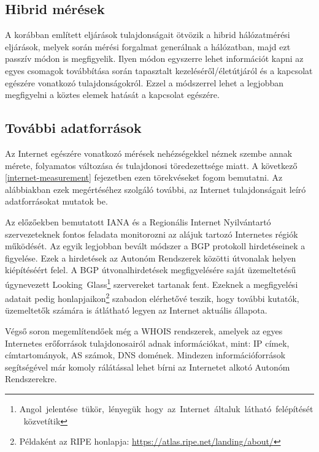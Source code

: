 \subsection{Hibrid mérések}

A korábban említett eljárások tulajdonságait ötvözik a hibrid hálózatmérési eljárások, melyek során mérési forgalmat generálnak a hálózatban, majd ezt passzív módon is megfigyelik. Ilyen módon egyszerre lehet információt kapni az egyes csomagok továbbítása során tapasztalt kezeléséről/életútjáról és a kapcsolat egészére vonatkozó tulajdonságokról. Ezzel a módszerrel lehet a legjobban megfigyelni a köztes elemek hatását a kapcsolat egészére.


\pagebreak

\subsection{További adatforrások}

Az Internet egészére vonatkozó mérések nehézségekkel néznek szembe annak mérete, folyamatos változása és tulajdonosi töredezettsége miatt. A következő \ref{internet-measurement} fejezetben ezen törekvéseket fogom bemutatni. Az alábbiakban ezek megértéséhez szolgáló további, az Internet tulajdonságait leíró adatforrásokat mutatok be.

Az előzőekben bemutatott IANA és a Regionális Internet Nyilvántartó szervezeteknek fontos feladata monitorozni az alájuk tartozó Internetes régiók működését. Az egyik legjobban bevált módszer a BGP protokoll hirdetéseinek a figyelése. Ezek a hirdetések az Autonóm Rendszerek közötti útvonalak helyen kiépítéséért felel. A BGP útvonalhirdetések megfigyelésére saját üzemeltetésű úgynevezett \mbox{Looking Glass\footnote{Angol jelentése tükör, lényegük hogy az Internet általuk látható felépítését közvetítik}} szervereket tartanak fent. 
Ezeknek a megfigyelési adatait pedig honlapjaikon\footnote{Példaként az RIPE honlapja: \url{https://atlas.ripe.net/landing/about/}} szabadon elérhetővé teszik, hogy további kutatók, üzemeltetők számára is átlátható legyen az Internet aktuális állapota.

Végső soron megemlítendőek még a WHOIS rendszerek, amelyek az egyes Internetes erőforrások tulajdonosairól adnak információkat, mint: IP címek, címtartományok, AS számok, DNS domének. Mindezen információforrások segítségével már komoly rálátással lehet bírni az Internetet alkotó Autonóm Rendszerekre.








